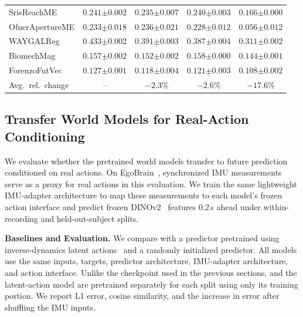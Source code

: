 \begin{table}[t]
\begin{tabular}{lcccc}
SrisReachME & $\mathbf{0.241{\scriptstyle\pm0.002}}$ & $0.235{\scriptstyle\pm0.007}$ & $\underline{0.240{\scriptstyle\pm0.003}}$ & $0.166{\scriptstyle\pm0.000}$ \\
OfnerApertureME & $\underline{0.233{\scriptstyle\pm0.018}}$ & $\mathbf{0.236{\scriptstyle\pm0.021}}$ & $0.228{\scriptstyle\pm0.012}$ & $0.056{\scriptstyle\pm0.012}$ \\
WAYGALReg & $\mathbf{0.433{\scriptstyle\pm0.002}}$ & $\underline{0.391{\scriptstyle\pm0.003}}$ & $0.387{\scriptstyle\pm0.004}$ & $0.311{\scriptstyle\pm0.002}$ \\
BiomechMag & $\underline{0.157{\scriptstyle\pm0.002}}$ & $0.152{\scriptstyle\pm0.002}$ & $\mathbf{0.158{\scriptstyle\pm0.000}}$ & $0.144{\scriptstyle\pm0.001}$ \\
ForenzoFutVec & $\mathbf{0.127{\scriptstyle\pm0.001}}$ & $0.118{\scriptstyle\pm0.004}$ & $\underline{0.121{\scriptstyle\pm0.003}}$ & $0.108{\scriptstyle\pm0.002}$ \\
\midrule
Avg.\ rel.\ change & -- & $-2.3\%$ & $-2.6\%$ & $-17.6\%$ \\
\bottomrule
\end{tabular}
\end{table}

\subsection{Transfer World Models for Real-Action Conditioning}
\label{sec:mwm-world-action-probe}

We evaluate whether the pretrained world models transfer to future prediction conditioned on real actions. On EgoBrain~\citep{lin2026egobrain}, synchronized IMU measurements serve as a proxy for real actions in this evaluation. We train the same lightweight IMU-adapter architecture to map these measurements to each model's frozen action interface and predict frozen DINOv2~\citep{oquab2024dinov2} features $0.2$\,s ahead under within-recording and held-out-subject splits.

\noindent\textbf{Baselines and Evaluation.}
We compare \mwm{} with a predictor pretrained using inverse-dynamics latent actions~\citep{garrido2026lawm} and a randomly initialized predictor. All models use the same inputs, targets, predictor architecture, IMU-adapter architecture, and action interface. Unlike the checkpoint used in the previous sections, \mwm{} and the latent-action model are pretrained separately for each split using only its training portion. We report L1 error, cosine similarity, and the increase in error after shuffling the IMU inputs.

